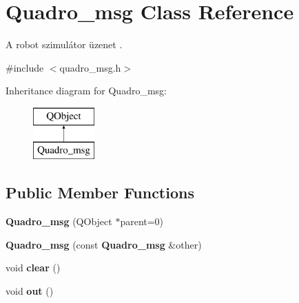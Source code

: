 \section{Quadro\-\_\-msg Class Reference}
\label{class_quadro__msg}


A robot szimulátor üzenet .  




{\ttfamily \#include $<$quadro\-\_\-msg.\-h$>$}

Inheritance diagram for Quadro\-\_\-msg\-:\begin{figure}[H]
\begin{center}
\leavevmode
\includegraphics[height=2.000000cm]{class_quadro__msg}
\end{center}
\end{figure}
\subsection*{Public Member Functions}
\begin{DoxyCompactItemize}
\item 
{\bfseries Quadro\-\_\-msg} (Q\-Object $\ast$parent=0)\label{class_quadro__msg_a38b36dc15f77161bcddce4f7975ab043}

\item 
{\bfseries Quadro\-\_\-msg} (const {\bf Quadro\-\_\-msg} \&other)\label{class_quadro__msg_a545277124fe3dee2e66245aa0b60abd4}

\item 
void {\bfseries clear} ()\label{class_quadro__msg_a41ada14c94d10d0a3fa0e50b40c2e24a}

\item 
void {\bfseries out} ()\label{class_quadro__msg_a8f74e212a5b72e132f2bf60d68b33b9a}

\end{DoxyCompactItemize}
